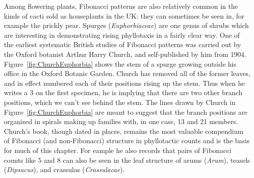 Among flowering plants, Fibonacci patterns are also relatively common in the kinds of cacti sold as houseplants in the UK: they can sometimes be seen in, for example the prickly pear. Spurges (\textit{Euphorbiaceae}) are one genus of shrubs which are interesting in demonstrating rising phyllotaxis in a fairly clear way. One of the earliest systematic British studies of Fibonacci patterns was carried out by the Oxford botanist Arthur Harry Church, and self-published by him from 1904.  Figure~\ref{fig:ChurchEuphorbia} shows the stem of a spurge growing outside his office in the Oxford Botanic Garden.
%
Church has removed all of the former leaves, and in effect numbered each of their positions rising up the stem. Thus when he writes a 3 on the first specimen, he is implying that there are two other branch positions, which we can't see behind the stem. 
The lines drawn by Church in Figure~\ref{fig:ChurchEuphorbia}  are meant to suggest that the branch positions are organised in spirals making up families with, in one case, 13 and 21 members.  Church's book, though dated in places, remains the most valuable compendium of Fibonacci (and non-Fibonacci) structure in phyllotactic counts and is the basis for much of this chapter. For eample he also records that pairs of Fibonacci counts like 5 and 8 can also be seen in the leaf structure of arums (\textit{Arum}), teasels (\textit{Dipsacus}), and crassulas (\textit{Crassulacae}).
 \\\mbox{}
 \clearpage
